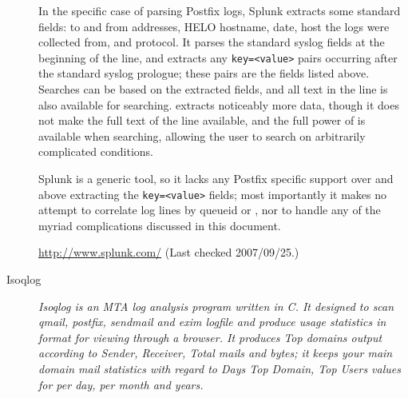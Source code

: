 \documentclass[a4paper,12pt,draft]{article}
\newcommand{\parsername}{\PLP{}}
\begin{document}
\begin{description}
        In the specific case of parsing Postfix logs, Splunk extracts some
        standard fields: to and from addresses, HELO hostname, date, host
        the logs were collected from, and protocol.  It parses the standard
        syslog fields at the beginning of the line, and extracts any
        \texttt{key=<value>} pairs occurring after the standard syslog
        prologue; these pairs are the fields listed above.  Searches can be
        based on the extracted fields, and all text in the line is also
        available for searching.  \parsername{} extracts noticeably more
        data, though it does not make the full text of the line available,
        and the full power of \SQL{} is available when searching, allowing
        the user to search on arbitrarily complicated conditions.

        Splunk is a generic tool, so it lacks any Postfix specific support
        over and above extracting the \texttt{key=<value>} fields; most
        importantly it makes no attempt to correlate log lines by queueid
        or \pid{}, nor to handle any of the myriad complications discussed
        in this document.

        \url{http://www.splunk.com/} \newline (Last checked 2007/09/25.)

    \item [Isoqlog] \textit{Isoqlog is an MTA log analysis program written
        in C. It designed to scan qmail, postfix, sendmail and exim logfile
        and produce usage statistics in \HTML{} format for viewing through
        a browser. It produces Top domains output according to Sender,
        Receiver, Total mails and bytes; it keeps your main domain mail
        statistics with regard to Days Top Domain, Top Users values for per
        day, per month and years.\/}


\end{description}
\end{document}
